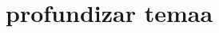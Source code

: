 \section{profundizar temaa} 
\textbf{}\\
\begin{flushleft}


\begin{itemize}




	


\end{itemize} 


\end{flushleft}